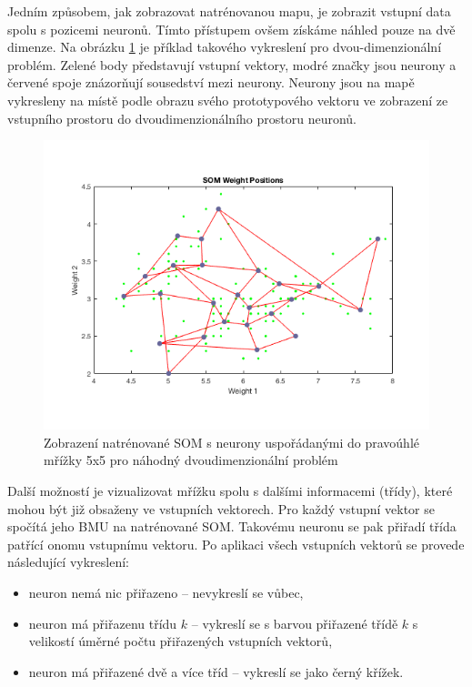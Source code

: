 \documentclass[thesis=M,czech]{FITthesis}[2012/06/26]
\begin{document}
Jedním způsobem, jak zobrazovat natrénovanou mapu, je zobrazit vstupní data spolu s pozicemi neuronů. Tímto přístupem ovšem získáme náhled pouze na dvě dimenze. Na obrázku \ref{fig:plotsompos} je příklad takového vykreslení pro dvou-dimenzionální problém. Zelené body představují vstupní vektory, modré značky jsou neurony a červené spoje znázorňují sousedství mezi neurony. Neurony jsou na mapě vykresleny na místě podle obrazu svého prototypového vektoru ve zobrazení ze vstupního prostoru do dvoudimenzionálního prostoru neuronů.


\begin{figure}[htbp]
\begin{center}
	\includegraphics[scale=0.5]{iris_plotsompos.png}
\caption{Zobrazení natrénované SOM s neurony uspořádanými do pravoúhlé mřížky 5x5 pro náhodný dvoudimenzionální problém}
\label{fig:plotsompos}
\end{center}
\end{figure}


Další možností je vizualizovat mřížku spolu s dalšími informacemi (třídy), které mohou být již obsaženy ve vstupních vektorech. Pro každý vstupní vektor se spočítá jeho BMU na natrénované SOM. Takovému neuronu se pak přiřadí třída patřící onomu vstupnímu vektoru. Po aplikaci všech vstupních vektorů se provede následující vykreslení:

\begin{itemize}
\item neuron nemá nic přiřazeno -- nevykreslí se vůbec,
\item neuron má přiřazenu třídu $k$ -- vykreslí se s barvou přiřazené třídě $k$ s velikostí úměrné počtu přiřazených vstupních vektorů, 
\item  neuron má přiřazené dvě a více tříd -- vykreslí se jako černý křížek.
\end{itemize}
 
\end{document}
